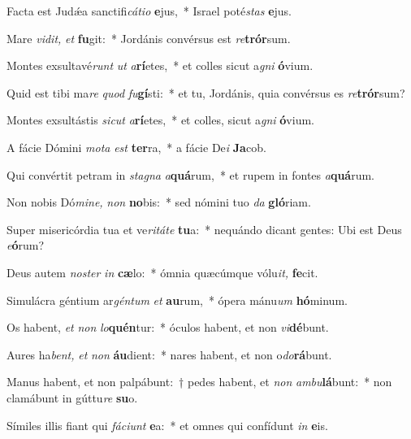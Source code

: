 \item Facta est Judǽa sanctifi\textit{cátio} \textbf{e}jus,~* Israel poté\hspace{0.03em}\textit{stas} \textbf{e}jus.
\item Mare \textit{vidit,} \textit{et} \textbf{fu}git:~* Jordánis convérsus est \textit{re}\textbf{trór}sum.
\item Montes exsultavé\hspace{0.03em}\textit{runt} \textit{ut} \textit{a}\textbf{rí}etes,~* et colles sicut a\textit{gni} \textbf{ó}vium.
\item Quid est tibi ma\hspace{0.03em}\textit{re} \textit{quod} \textit{fu}\textbf{gí}sti:~* et tu, Jordánis, quia convérsus es \textit{re}\textbf{trór}sum?
\item Montes exsultástis \textit{sicut} \textit{a}\textbf{rí}etes,~* et colles, sicut a\textit{gni} \textbf{ó}vium.
\item A fácie Dómini \textit{mota} \textit{est} \textbf{ter}ra,~* a fácie De\textit{i} \textbf{Ja}cob.
\item Qui convértit petram in \textit{stagna} \textit{a}\textbf{quá}rum,~* et rupem in fontes \textit{a}\textbf{quá}rum.
\item Non nobis Dó\textit{mine,} \textit{non} \textbf{no}bis:~* sed nómini tuo \textit{da} \textbf{gló}riam.
\item Super misericórdia tua et ve\hspace{0.03em}\textit{ritáte} \textbf{tu}a:~* nequándo dicant gentes: Ubi est Deus \textit{e}\textbf{ó}rum?
\item Deus autem \textit{noster} \textit{in} \textbf{cæ}lo:~* ómnia quæcúmque vólu\textit{it,} \textbf{fe}cit.
\item Simulácra géntium ar\textit{géntum} \textit{et} \textbf{au}rum,~* ópera mánu\textit{um} \textbf{hó}minum.
\item Os habent, \textit{et} \textit{non} \textit{lo}\textbf{quén}tur:~* óculos habent, et non \textit{vi}\textbf{dé}bunt.
\item Aures ha\hspace{0.03em}\textit{bent,} \textit{et} \textit{non} \textbf{áu}dient:~* nares habent, et non o\textit{do}\textbf{rá}bunt.
\item Manus habent, et non palpábunt:~† pedes habent, et \textit{non} \textit{ambu}\textbf{lá}bunt:~* non clamábunt in gúttu\textit{re} \textbf{su}o.
\item Símiles illis fiant qui \textit{fáciunt} \textbf{e}a:~* et omnes qui confídunt \textit{in} \textbf{e}is.
